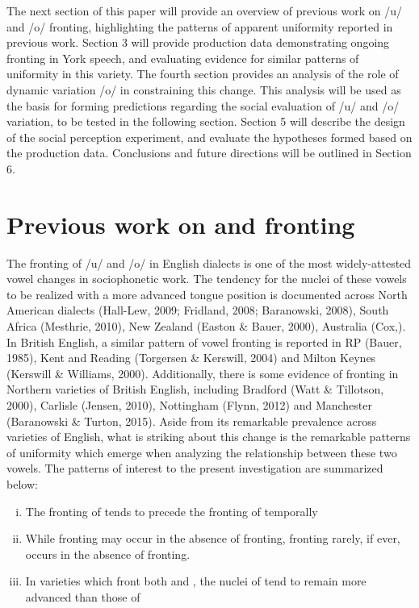 \documentclass[PWPL]{article}
\begin{document}
The next section of this paper will provide an overview of previous work on /u/ and /o/ fronting, highlighting the patterns of apparent uniformity reported in previous work. Section 3 will provide production data demonstrating ongoing fronting in York speech, and evaluating evidence for similar patterns of uniformity in this variety. The fourth section provides an analysis of the role of dynamic variation /o/ in constraining this change. This analysis will be used as the basis for forming predictions regarding the social evaluation of /u/ and /o/ variation, to be tested in the following section. Section 5 will describe the design of the social perception experiment, and evaluate the hypotheses formed based on the production data. Conclusions and future directions will be outlined in Section 6.

\section{Previous work on  and  fronting}

The fronting of /u/ and /o/ in English dialects is one of the most widely-attested vowel changes in sociophonetic work. The tendency for the nuclei of these vowels to be realized with a more advanced tongue position is documented across North American dialects (Hall-Lew, 2009; Fridland, 2008; Baranowski, 2008), South Africa (Mesthrie, 2010), New Zealand (Easton \& Bauer, 2000), Australia (Cox,). In British English, a similar pattern of vowel fronting is reported in RP (Bauer, 1985), Kent and Reading (Torgersen \& Kerswill, 2004) and Milton Keynes (Kerswill \& Williams, 2000). Additionally, there is some evidence of fronting in Northern varieties of British English, including Bradford (Watt \& Tillotson, 2000), Carlisle (Jensen, 2010), Nottingham (Flynn, 2012) and Manchester (Baranowski \& Turton, 2015). Aside from its remarkable prevalence across varieties of English, what is striking about this change is the remarkable patterns of uniformity which emerge when analyzing the relationship between these two vowels. The patterns of interest to the present investigation are summarized below:

\begin{enumerate}[i.]
\item{The fronting of  tends to precede the fronting of  temporally}
\item{While  fronting may occur in the absence of  fronting,  fronting rarely, if ever, occurs in the absence of  fronting.}
\item{In varieties which front both  and , the nuclei of  tend to remain more advanced than those of }
\end{enumerate} 
\end{document}
